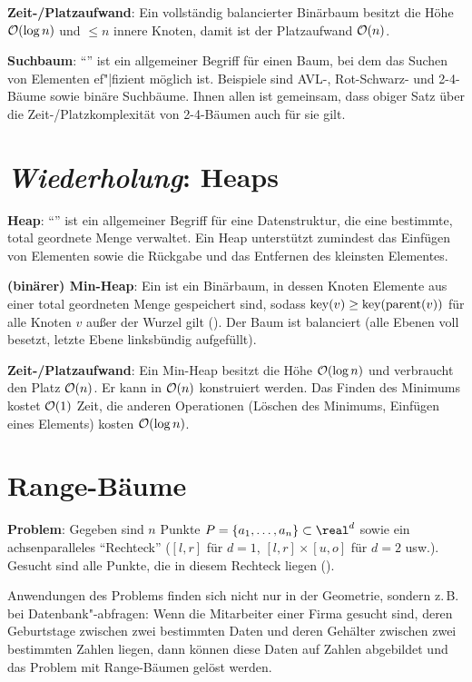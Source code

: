 \textbf{Zeit-/Platzaufwand}:
Ein vollständig balancierter Binärbaum besitzt die Höhe $\mathcal{O}(\log n)$
und $\le n$ innere Knoten, damit ist der Platzaufwand $\mathcal{O}(n)$.

\linie

\textbf{Suchbaum}:
"`"' ist ein allgemeiner Begriff für einen Baum, bei dem das Suchen von Elementen
ef"|fizient möglich ist.
Beispiele sind AVL-, Rot-Schwarz- und 2-4-Bäume sowie binäre Suchbäume.
Ihnen allen ist gemeinsam, dass obiger Satz über die Zeit-/Platzkomplexität von 2-4-Bäumen
auch für sie gilt.

\section{%
    \emph{Wiederholung}: Heaps%
}

\textbf{Heap}:
"`"' ist ein allgemeiner Begriff für eine Datenstruktur, die eine bestimmte,
total geordnete Menge verwaltet.
Ein Heap unterstützt zumindest das Einfügen von Elementen sowie
die Rückgabe und das Entfernen des kleinsten Elementes.

\textbf{(binärer) Min-Heap}:
Ein  ist ein Binärbaum, in dessen Knoten Elemente aus einer
total geordneten Menge gespeichert sind, sodass
$\text{key}(v) \ge \text{key}(\operatorname{parent}(v))$ für alle Knoten $v$ außer der Wurzel gilt
().
Der Baum ist balanciert
(alle Ebenen voll besetzt, letzte Ebene linksbündig aufgefüllt).

\textbf{Zeit-/Platzaufwand}:
Ein Min-Heap besitzt die Höhe $\mathcal{O}(\log n)$ und verbraucht den Platz $\mathcal{O}(n)$.
Er kann in $\mathcal{O}(n)$ konstruiert werden.
Das Finden des Minimums kostet $\mathcal{O}(1)$ Zeit,
die anderen Operationen (Löschen des Minimums, Einfügen eines Elements) kosten $\mathcal{O}(\log n)$.

\pagebreak

\section{%
    Range-Bäume%
}

\textbf{Problem}:
Gegeben sind $n$ Punkte $P = \{a_1, \dotsc, a_n\} \subset \real^d$ sowie ein
achsenparalleles "`Rechteck"' ($[l, r]$ für $d = 1$, $[l, r] \times [u, o]$ für $d = 2$ usw.).\\
Gesucht sind alle Punkte, die in diesem Rechteck liegen
().

Anwendungen des Problems finden sich nicht nur in der Geometrie, sondern z.\,B. bei
Datenbank"-abfragen:
Wenn die Mitarbeiter einer Firma gesucht sind, deren Geburtstage zwischen zwei bestimmten Daten und
deren Gehälter zwischen zwei bestimmten Zahlen liegen, dann können diese Daten auf Zahlen
abgebildet und das Problem mit Range-Bäumen gelöst werden.

